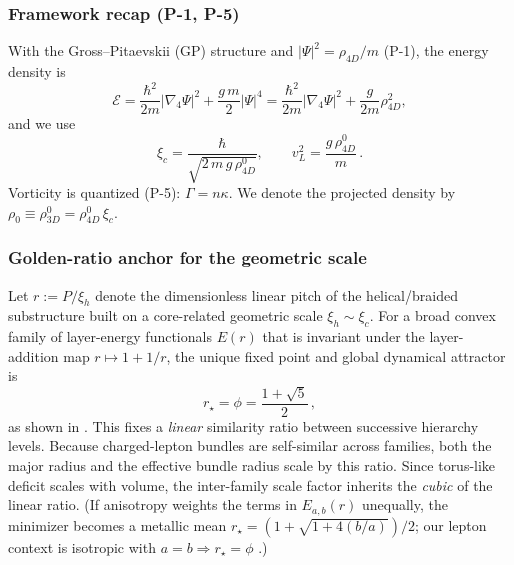 \subsubsection{Framework recap (P-1, P-5)}
With the Gross–Pitaevskii (GP) structure and \(|\Psi|^2=\rho_{4D}/m\) (P-1), the energy density is
\[
\mathcal E=\frac{\hbar^2}{2m}|\nabla_4\Psi|^2+\frac{g\,m}{2}|\Psi|^4
=\frac{\hbar^2}{2m}|\nabla_4\Psi|^2+\frac{g}{2m}\rho_{4D}^2,
\]
and we use
\[
\xi_c=\frac{\hbar}{\sqrt{2\,m\,g\,\rho_{4D}^0}},\qquad
v_L^2=\frac{g\,\rho_{4D}^0}{m}\,.
\]
Vorticity is quantized (P-5): \(\Gamma=n\kappa\). We denote the projected density by \(\rho_0\equiv\rho_{3D}^0=\rho_{4D}^0\,\xi_c\).

\subsubsection{Golden-ratio anchor for the geometric scale}
Let \(r:=P/\xi_h\) denote the dimensionless linear pitch of the helical/braided substructure built on a core-related geometric scale \(\xi_h\sim\xi_c\). For a broad convex family of layer-energy functionals \(E(r)\) that is invariant under the layer-addition map \(r\mapsto 1+1/r\), the unique fixed point and global dynamical attractor is
\[
r_\star=\phi=\frac{1+\sqrt{5}}{2}\,,
\]
as shown in \cite{Norris2025GoldenRatio}. This fixes a \emph{linear} similarity ratio between successive hierarchy levels. Because charged-lepton bundles are self-similar across families, both the major radius and the effective bundle radius scale by this ratio. Since torus-like deficit scales with volume, the inter-family scale factor inherits the \emph{cubic} of the linear ratio. (If anisotropy weights the terms in \(E_{a,b}(r)\) unequally, the minimizer becomes a metallic mean \(r_\star=(1+\sqrt{1+4(b/a)})/2\); our lepton context is isotropic with \(a=b\Rightarrow r_\star=\phi\) \cite{Norris2025GoldenRatio}.)

